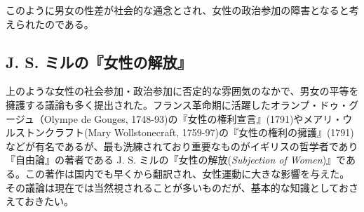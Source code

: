\documentclass[dvipdfmx,uplatex]{jsarticle}
\begin{document}
このように男女の性差が社会的な通念とされ、女性の政治参加の障害となると考えられたのである。


\subsection{J. S. ミルの『女性の解放』}


上のような女性の社会参加・政治参加に否定的な雰囲気のなかで、男女の平等を擁護する議論も多く提出された。フランス革命期に活躍したオランプ・ドゥ・グージュ（Olympe de Gouges, 1748-93)の『女性の権利宣言』(1791)やメアリ・ウルストンクラフト(Mary Wollstonecraft, 1759-97)の『女性の権利の擁護』(1791)などが有名であるが、最も洗練されており重要なものがイギリスの哲学者であり『自由論』の著者である J.  S. ミルの『女性の解放(\emph{Subjection of Women})』\citep{mill1869:_subjec_of_women}である。この著作は国内でも早くから翻訳され、女性運動に大きな影響を与えた。その議論は現在では当然視されることが多いものだが、基本的な知識としておさえておきたい。
\end{document}
